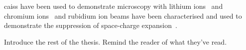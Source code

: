 \Glspl{cais} have been used to demonstrate microscopy with lithium ions~\cite{knuffman_nanoscale_2011} and chromium ions~\cite{steele_focused_2010} and rubidium ion beams have been characterised and used to demonstrate the suppression of space-charge expansion~\cite{murphy_detailed_2014,thompson_suppression_2016}.


{\color{red}Introduce the rest of the thesis. Remind the reader of what they've read.}

